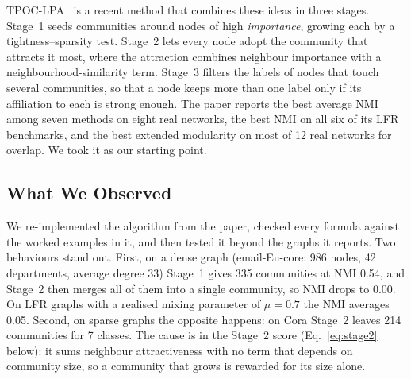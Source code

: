 \documentclass[conference]{IEEEtran}
\begin{document}
TPOC-LPA~\cite{kong2026} is a recent method that combines these ideas in three stages. Stage~1 seeds communities around nodes of high \emph{importance}, growing each by a tightness--sparsity test. Stage~2 lets every node adopt the community that attracts it most, where the attraction combines neighbour importance with a neighbourhood-similarity term. Stage~3 filters the labels of nodes that touch several communities, so that a node keeps more than one label only if its affiliation to each is strong enough. The paper reports the best average NMI among seven methods on eight real networks, the best NMI on all six of its LFR benchmarks, and the best extended modularity on most of 12 real networks for overlap. We took it as our starting point.

\subsection{What We Observed}
We re-implemented the algorithm from the paper, checked every formula against the worked examples in it, and then tested it beyond the graphs it reports. Two behaviours stand out. First, on a dense graph (email-Eu-core: 986 nodes, 42 departments, average degree 33) Stage~1 gives 335 communities at NMI 0.54, and Stage~2 then merges all of them into a single community, so NMI drops to 0.00. On LFR graphs with a realised mixing parameter of $\mu=0.7$ the NMI averages 0.05. Second, on sparse graphs the opposite happens: on Cora Stage~2 leaves 214 communities for 7 classes. The cause is in the Stage~2 score (Eq.~\eqref{eq:stage2} below): it sums neighbour attractiveness with no term that depends on community size, so a community that grows is rewarded for its size alone.
\end{document}
